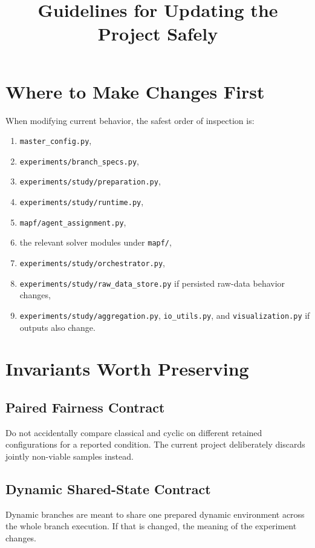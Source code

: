 \documentclass[11pt]{article}
\title{Guidelines for Updating the Project Safely}
\author{}
\date{}
\begin{document}
\maketitle

\section{Where to Make Changes First}

When modifying current behavior, the safest order of inspection is:
\begin{enumerate}[leftmargin=2em]
    \item \texttt{master\_config.py},
    \item \texttt{experiments/branch\_specs.py},
    \item \texttt{experiments/study/preparation.py},
    \item \texttt{experiments/study/runtime.py},
    \item \texttt{mapf/agent\_assignment.py},
    \item the relevant solver modules under \texttt{mapf/},
    \item \texttt{experiments/study/orchestrator.py},
    \item \texttt{experiments/study/raw\_data\_store.py} if persisted raw-data behavior changes,
    \item \texttt{experiments/study/aggregation.py}, \texttt{io\_utils.py}, and \texttt{visualization.py} if outputs also change.
\end{enumerate}

\section{Invariants Worth Preserving}

\subsection{Paired Fairness Contract}
Do not accidentally compare classical and cyclic on different retained configurations for a reported condition. The current project deliberately discards jointly non-viable samples instead.

\subsection{Dynamic Shared-State Contract}
Dynamic branches are meant to share one prepared dynamic environment across the whole branch execution. If that is changed, the meaning of the experiment changes.
\end{document}
